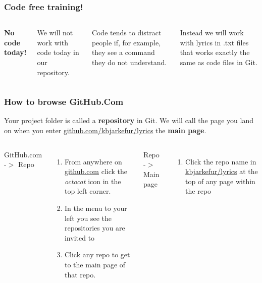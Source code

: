 \documentclass[aspectratio=169]{beamer} %
\newcommand{\trainingURL}[1]{{\color{blue}\url{#1}}}
\newcommand{\traininerUsername}{kbjarkefur}
\newcommand{\repoName}{\traininerUsername/lyrics}
\newcommand{\trainingRepoURL}[1]{\trainingURL{github.com/\repoName #1}}
\begin{document}
\begin{frame}
\frametitle{Code free training!}

	\begin{columns}[c] 
		
		
		\textbf{No code today!}
		
		\vspace{.5cm}
		
		We will not work with code today in our repository.
		
		\vspace{.25cm}
		
		Code tends to distract people if, for example, they see a command they do not understand. 
		
		\vspace{.25cm}
		
		Instead we will work with lyrics in .txt files that works exactly the same as code files in Git.
		
		
	\end{columns}
\end{frame}

\begin{frame}
\frametitle{How to browse GitHub.Com}

	Your project folder is called a \textbf{repository} in Git. We will call the page you land on when you enter \trainingRepoURL{} the \textbf{main page}.
	
	\vspace{.5cm}

	\begin{columns}[T] 
	
		GitHub.com -$>$ Repo
		\begin{enumerate}
			\item From anywhere on \trainingURL{github.com} click the \textit{octocat} icon in the top left corner.
			\item In the menu to your left you see the repositories you are invited to
			\item Click any repo to get to the main page of that repo.
		\end{enumerate}
		
		Repo -$>$ Main page
		\begin{enumerate}
			\item Click the repo name in {\color{blue}\url{\repoName}} at the top of any page within the repo
		\end{enumerate}
			
	\end{columns}
\end{frame}
\end{document}
